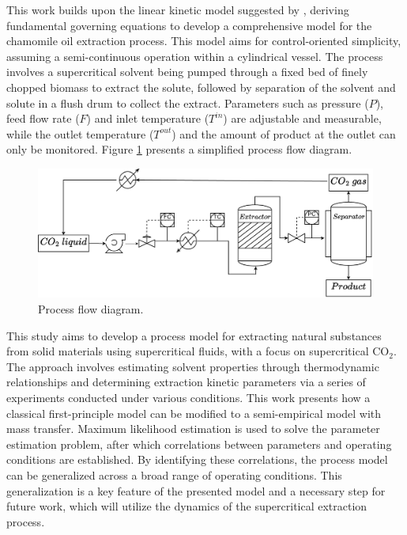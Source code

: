 \documentclass[a4paper,fleqn]{cas-dc}
\begin{document}
This work builds upon the linear kinetic model suggested by \citet{Reverchon1996}, deriving fundamental governing equations to develop a comprehensive model for the chamomile oil extraction process. This model aims for control-oriented simplicity, assuming a semi-continuous operation within a cylindrical vessel. The process involves a supercritical solvent being pumped through a fixed bed of finely chopped biomass to extract the solute, followed by separation of the solvent and solute in a flush drum to collect the extract. Parameters such as pressure ($P$), feed flow rate ($F$) and inlet temperature ($T^{in}$) are adjustable and measurable, while the outlet temperature ($T^{out}$) and the amount of product at the outlet can only be monitored. Figure \ref{fig: SFE_drawing} presents a simplified process flow diagram.

\begin{figure}[h!]
	\centering
	\includegraphics[width=\columnwidth]{Figures/PFD.drawio.pdf}
	\caption{Process flow diagram.}
	\label{fig: SFE_drawing}
\end{figure}

This study aims to develop a process model for extracting natural substances from solid materials using supercritical fluids, with a focus on supercritical CO$_2$. The approach involves estimating solvent properties through thermodynamic relationships and determining extraction kinetic parameters via a series of experiments conducted under various conditions. This work presents how a classical first-principle model can be modified to a semi-empirical model with mass transfer. Maximum likelihood estimation is used to solve the parameter estimation problem, after which correlations between parameters and operating conditions are established. By identifying these correlations, the process model can be generalized across a broad range of operating conditions. This generalization is a key feature of the presented model and a necessary step for future work, which will utilize the dynamics of the supercritical extraction process.
\end{document}
